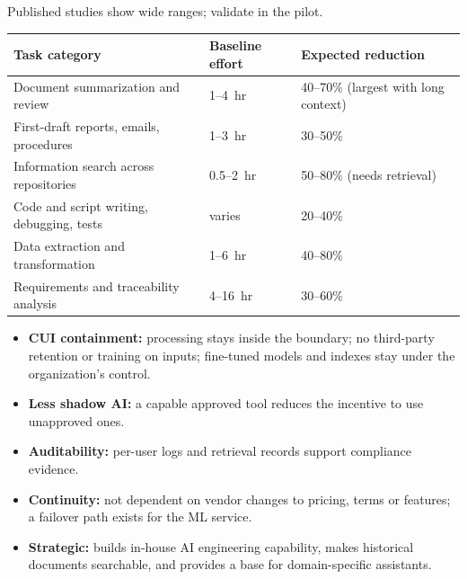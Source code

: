 Published studies show wide ranges; validate in the pilot.

{\small
\begin{tabularx}{\textwidth}{@{}Y{1.448}Y{0.517}Y{1.035}@{}}
  \toprule
  Task category & Baseline effort & Expected reduction \\
  \midrule
  Document summarization and review & 1--4~hr & 40--70\% (largest with long context) \\
  First-draft reports, emails, procedures & 1--3~hr & 30--50\% \\
  Information search across repositories & 0.5--2~hr & 50--80\% (needs retrieval) \\
  Code and script writing, debugging, tests & varies & 20--40\% \\
  Data extraction and transformation & 1--6~hr & 40--80\% \\
  Requirements and traceability analysis & 4--16~hr & 30--60\% \\
  \bottomrule
\end{tabularx}}

\begin{itemize}
  \item \textbf{CUI containment:} processing stays inside the boundary; no third-party
    retention or training on inputs; fine-tuned models and indexes stay under the
    organization's control.
  \item \textbf{Less shadow AI:} a capable approved tool reduces the incentive to use
    unapproved ones.
  \item \textbf{Auditability:} per-user logs and retrieval records support compliance
    evidence.
  \item \textbf{Continuity:} not dependent on vendor changes to pricing, terms or
    features; a failover path exists for the ML service.
  \item \textbf{Strategic:} builds in-house AI engineering capability, makes historical
    documents searchable, and provides a base for domain-specific assistants.
\end{itemize}
